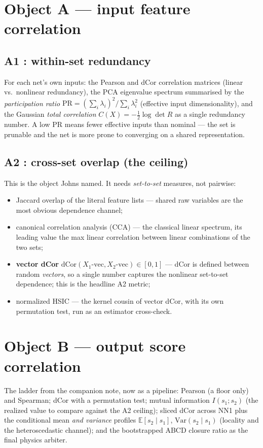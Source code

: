 \documentclass[11pt]{article}
\newcommand{\dcor}{\mathrm{dCor}}
\newcommand{\I}{I}
\begin{document}
\section{Object A --- input feature correlation}
\subsection{A1 : within-set redundancy}
For each net's own inputs: the Pearson and dCor correlation matrices (linear vs.\
nonlinear redundancy), the PCA eigenvalue spectrum summarised by the
\emph{participation ratio} $\mathrm{PR}=(\sum_i\lambda_i)^2/\sum_i\lambda_i^2$
(effective input dimensionality), and the Gaussian \emph{total correlation}
$C(X)=-\tfrac12\log\det R$ as a single redundancy number. A low PR means fewer
effective inputs than nominal --- the set is prunable and the net is more prone
to converging on a shared representation.

\subsection{A2 : cross-set overlap (the ceiling)}
This is the object Johns named. It needs \emph{set-to-set} measures, not pairwise:
\begin{itemize}[nosep]
\item Jaccard overlap of the literal feature lists --- shared raw variables are
      the most obvious dependence channel;
\item canonical correlation analysis (CCA) --- the classical linear spectrum,
      its leading value the max linear correlation between linear combinations
      of the two sets;
\item \textbf{vector dCor} $\dcor(X_1\text{-vec},X_2\text{-vec})\in[0,1]$ ---
      dCor is defined between random \emph{vectors}, so a single number captures
      the nonlinear set-to-set dependence; this is the headline A2 metric;
\item normalized HSIC --- the kernel cousin of vector dCor, with its own
      permutation test, run as an estimator cross-check.
\end{itemize}

\section{Object B --- output score correlation}
The ladder from the companion note, now as a pipeline: Pearson (a floor only) and
Spearman; dCor with a permutation test; mutual information $\I(s_1;s_2)$ (the
realized value to compare against the A2 ceiling); sliced dCor across NN1 plus
the conditional mean \emph{and variance} profiles $\mathbb{E}[s_2\mid s_1]$,
$\mathrm{Var}(s_2\mid s_1)$ (locality and the heteroscedastic channel); and the
bootstrapped ABCD closure ratio as the final physics arbiter.
\end{document}
